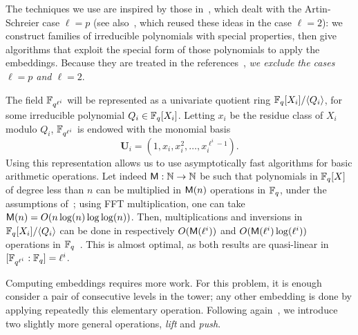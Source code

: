 \documentclass{sig-alternate}
\newcommand{\uu}{\mathbf{U}}  %
\begin{document}

The techniques we use are inspired by those in~\cite{df+schost12},
which dealt with the Artin-Schreier case $\ell=p$ (see
also~\cite{DoSc12}, which reused these ideas in the case $\ell=2$): we
construct families of irreducible polynomials with special properties,
then give algorithms that exploit the special form of those
polynomials to apply the embeddings. Because they are treated in the
references~\cite{df+schost12,DoSc12}, {\em we exclude the cases $\ell=p$
and $\ell=2$}.

The field $\mathbb{F}_{q^{\ell^i}}$ will be represented as a univariate
quotient ring $\mathbb{F}_q[X_i]/\langle Q_i\rangle$, for some irreducible
polynomial $Q_i \in \mathbb{F}_q[X_i]$. Letting $x_i$ be the residue class of
$X_i$ modulo $Q_i$, $\mathbb{F}_{q^{\ell^i}}$ is endowed with the monomial
basis
\begin{equation}
  \label{eq:uni-basis1}
  \uu_i = (1,x_{i},x_{i}^2,\ldots,x_{i}^{\ell^{i}-1}).
\end{equation}
Using this representation allows us to use asymptotically fast
algorithms for basic arithmetic operations. Let indeed $\mathsf{M} : \mathbb{N}
\rightarrow \mathbb{N}$ be such that polynomials in $\mathbb{F}_q[X]$ of degree less
than $n$ can be multiplied in $\mathsf{M}(n)$ operations in $\mathbb{F}_q$, under
the assumptions of~\cite[Ch.~8.3]{vzGG}; using FFT multiplication, one
can take $\mathsf{M}(n)=O(n\log (n) \log\log (n))$. Then, multiplications
and inversions in $\mathbb{F}_q[X_i]/\langle Q_i \rangle$ can be done in
respectively $O(\mathsf{M}(\ell^i))$ and $O(\mathsf{M}(\ell^i)\log(\ell^i))$
operations in $\mathbb{F}_q$~\cite[Ch.~9-11]{vzGG}. This is almost optimal, as
both results are quasi-linear in $[\mathbb{F}_{q^{\ell^i}}:\mathbb{F}_q]=\ell^i$.

Computing embeddings requires more work. For this problem, it is
enough consider a pair of consecutive levels in the tower; any other
embedding is done by applying repeatedly this elementary
operation. Following again~\cite{df+schost12}, we introduce two
slightly more general operations, {\em lift} and {\em push}.
\end{document}
